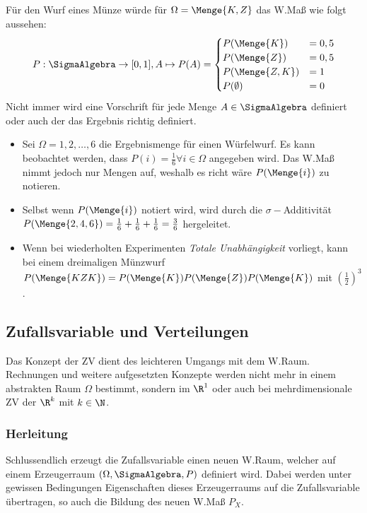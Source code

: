 Für den Wurf eines Münze würde für $\Omega = \Menge{K,Z}$ das \gls{W.}Maß wie folgt aussehen:
\begin{align*}
	P: \SigmaAlgebra \rightarrow [0,1],
	A \mapsto P(A) = \begin{cases}
		P(\Menge{K}) & = 0,5\\
		P(\Menge{Z}) & = 0,5\\
		P(\Menge{Z,K}) & = 1\\
		P(\emptyset) & = 0\\
	\end{cases}
\end{align*}
Nicht immer wird eine Vorschrift für jede Menge $A\in\SigmaAlgebra$ definiert oder auch der das Ergebnis richtig definiert. 
\begin{itemize}
	\item Sei $\Omega = {1,2, \dots, 6}$ die Ergebnismenge für einen Würfelwurf. Es kann beobachtet werden, dass $P(i) = \frac{1}{6} \forall i \in \Omega$ angegeben wird. Das \gls{W.}Maß nimmt jedoch nur Mengen auf, weshalb es richt wäre $P(\Menge{i})$ zu notieren. 
	\item Selbst wenn $P(\Menge{i})$ notiert wird, wird durch die $\sigma-$Additivität $P(\Menge{2,4,6}) = \frac{1}{6} + \frac{1}{6} + \frac{1}{6} = \frac{3}{6}$ hergeleitet.
	\item Wenn bei wiederholten Experimenten \textit{Totale Unabhängigkeit} vorliegt, kann bei einem dreimaligen Münzwurf $P(\Menge{KZK}) = P(\Menge{K})P(\Menge{Z})P(\Menge{K})$ mit $\left(\frac{1}{2}\right)^3$.
\end{itemize}

\subsection{Zufallsvariable und Verteilungen} \label{sec: Zufallsvariable und Verteilungen}
Das Konzept der \gls{ZV} %
dient des leichteren Umgangs mit dem \gls{W.}Raum. Rechnungen und weitere aufgesetzten Konzepte werden nicht mehr in einem abstrakten Raum $\Omega$ bestimmt, sondern im $\R^1$ oder auch bei mehrdimensionale \gls{ZV} der $\R^k$ mit $k\in \N$. 

\subsubsection{Herleitung}
Schlussendlich erzeugt die Zufallsvariable einen neuen \gls{W.}Raum, welcher auf einem Erzeugerraum $(\Omega, \SigmaAlgebra, P)$ definiert wird. Dabei werden unter gewissen Bedingungen Eigenschaften dieses Erzeugerraums auf die Zufallsvariable übertragen, so auch die Bildung des neuen \gls{W.}Maß $P_X$.
